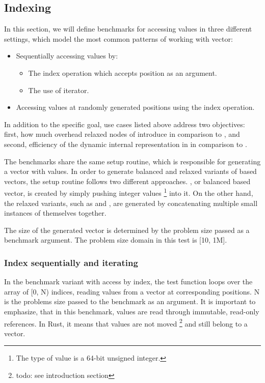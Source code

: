 \subsection{Indexing}
In this section, we will define benchmarks for accessing values in three different settings, which model the most common patterns of working with vector: 

\begin{itemize}
    \item Sequentially accessing values by:    
    \begin{itemize}
        \item The index operation which accepts position as an argument. 
        \item The use of iterator. 
    \end{itemize}
    \item Accessing values at randomly generated positions using the index operation. 
\end{itemize}

In addition to the specific goal, use cases listed above address two objectives: first, how much overhead relaxed nodes of \rrbtree{} introduce in comparison to \rbtree{}, and second, efficiency of the dynamic internal representation in \pvec{} in comparison to \stdvec{}. 

The benchmarks share the same setup routine, which is responsible for generating a vector with values. In order to generate balanced and relaxed variants of \rbtree{} based vectors, the setup routine follows two different approaches. \rbvec{}, or balanced \rbtree{} based vector, is created by simply pushing integer values \footnote{The type of value is a 64-bit unsigned integer.} into it. On the other hand, the relaxed variants, such as \rrbvec{} and \pvec{}, are generated by concatenating multiple small instances of themselves together.

The size of the generated vector is determined by the problem size passed as a benchmark argument. The problem size domain in this test is [10, 1M]. 

\subsubsection*{Index sequentially and iterating}
In the benchmark variant with access by index, the test function loops over the array of [0, N) indices, reading values from a vector at corresponding positions. N  is the problems size passed to the benchmark as an argument. It is important to emphasize, that in this benchmark, values are read through immutable, read-only references. In Rust, it means that values are not moved \footnote{todo: see introduction section} and still belong to a vector. 

